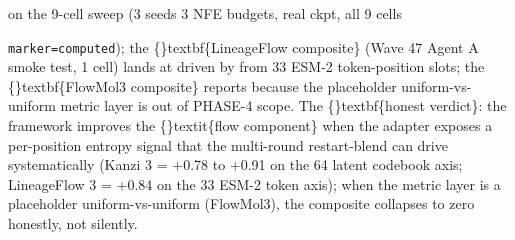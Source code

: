\documentclass{article}
\begin{document}
 on the 9-cell sweep (3 seeds  3 NFE budgets, real ckpt, all 9 cells

\texttt{marker=computed}); the \{\}textbf\{LineageFlow composite\} (Wave 47 Agent A smoke test, 1 cell) lands at  driven by  from 33 ESM-2 token-position slots; the \{\}textbf\{FlowMol3 composite\} reports  because the placeholder uniform-vs-uniform metric layer is out of PHASE-4 scope. The \{\}textbf\{honest verdict\}: the framework improves the \{\}textit\{flow component\} when the adapter exposes a per-position entropy signal that the multi-round restart-blend can drive systematically (Kanzi 3 = +0.78 to +0.91 on the 64 latent codebook axis; LineageFlow 3 = +0.84 on the 33 ESM-2 token axis); when the metric layer is a placeholder uniform-vs-uniform (FlowMol3), the composite collapses to zero honestly, not silently.
\end{document}
